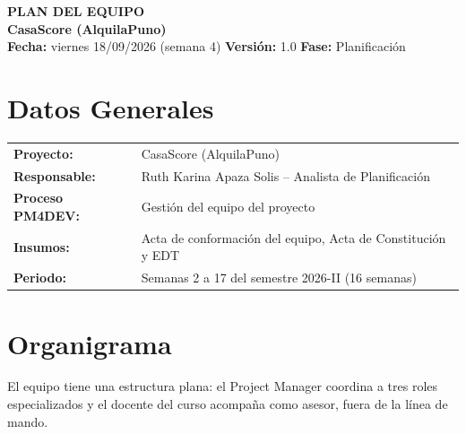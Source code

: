 \documentclass[11pt,a4paper]{article}
\begin{document}
\begin{center}
    {\Large \textbf{\textcolor{AzulUNA}{PLAN DEL EQUIPO}}}\\[3pt]
    {\normalsize \textbf{CasaScore (AlquilaPuno)}}\\[4pt]
    \footnotesize \textbf{Fecha:} viernes 18/09/2026 (semana 4) \quad \textbar\quad \textbf{Versión:} 1.0 \quad \textbar\quad \textbf{Fase:} Planificación
\end{center}

\vspace{0.1cm}

\section{Datos Generales}
\noindent\begin{tabularx}{\textwidth}{@{}P{4.2cm} L@{}}
\toprule
\textbf{Proyecto:} & CasaScore (AlquilaPuno) \\
\textbf{Responsable:} & Ruth Karina Apaza Solis -- Analista de Planificación \\
\textbf{Proceso PM4DEV:} & Gestión del equipo del proyecto \\
\textbf{Insumos:} & Acta de conformación del equipo, Acta de Constitución y EDT \\
\textbf{Periodo:} & Semanas 2 a 17 del semestre 2026-II (16 semanas) \\
\bottomrule
\end{tabularx}

\section{Organigrama}
El equipo tiene una estructura plana: el Project Manager coordina a tres roles especializados y el docente del curso acompaña como asesor, fuera de la línea de mando.
\end{document}
